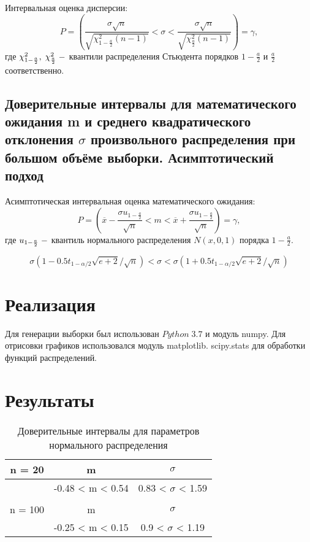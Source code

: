 \documentclass[a4]{article}
\begin{document}
		Интервальная оценка дисперсии:
		$$
		P=\left(\frac{\sigma\sqrt{n}}{\sqrt{\chi^2_{1-\frac{a}{2}}(n-1)}}<\sigma<\frac{\sigma\sqrt{n}}{\sqrt{\chi^2_\frac{a}{2}(n-1)}}\right) = \gamma,
		$$
		где $\chi_{1-\frac{a}{2}}^2,\;\chi_\frac{a}{2}^2\;\--$ квантили распределения Стьюдента порядков $1-\frac{a}{2}$ и $\frac{a}{2}$ соответственно.
		\subsection{Доверительные интервалы для математического ожидания m и среднего квадратического отклонения $\sigma$ произвольного распределения при большом объёме выборки. Асимптотический подход}
		
		Асимптотическая интервальная оценка математического ожидания:
		$$P = \left(\overline{x}-\frac{\sigma u_{1-\frac{a}{2}}}{\sqrt{n}}<m<\overline{x}+\frac{\sigma u_{1-\frac{a}{2}}}{\sqrt{n}}\right)=\gamma,
		$$
		где $u_{1-\frac{a}{2}}\;\--$ квантиль нормального распределения $N(x,0,1)$ порядка $1-\frac{a}{2}.$
		
		$$\sigma(1 - 0.5t_{1 - \alpha/2} \sqrt{e + 2}/ \sqrt{n}) < \sigma < \sigma(1 + 0.5t_{1 - \alpha/2} \sqrt{e + 2}/ \sqrt{n})$$
		
	\section{Реализация}
	Для генерации выборки был использован $Python\;3.7$ и модуль numpy. Для отрисовки графиков использовался модуль matplotlib. scipy.stats для обработки функций распределений.
	
	\section{Результаты}
		\begin{table}[h!]
			
			\caption{Доверительные интервалы для параметров нормального распределения}
			\label{tab:my_label}
			\begin{center}
				\vspace{5mm}
				
				\begin{tabular}{|c|c|c|}
					\hline
					n = 20 & m & $\sigma$\\
					\hline
					& -0.48 < m < 0.54 & 0.83 < $\sigma$ < 1.59\\ 
					\hline
					& &\\
					\hline
					n = 100 & m & $\sigma$\\
					\hline
					& -0.25 < m < 0.15 & 0.9 < $\sigma$ < 1.19\\
					\hline
				\end{tabular}
			\end{center}
		\end{table}
		
\end{document}
